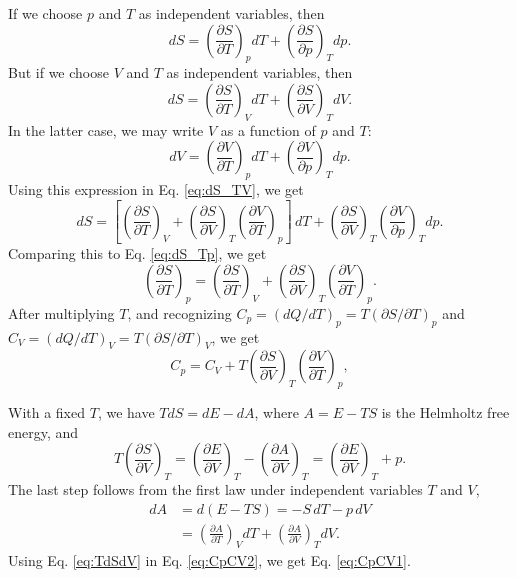 \documentclass[twocolumn, 10pt]{article}
\numberwithin{equation}{section}
\newenvironment{solution}[1][\empty]
{\par\medskip\sffamily
  \textbf{\ifx\empty#1{Solution.}\relax\else{#1}\fi} \ignorespaces}
{\medskip}
\begin{document}
\begin{solution}
If we choose $p$ and $T$ as independent variables, then
\begin{equation}
  dS =
  \left( \frac{ \partial S } { \partial T } \right)_p dT
  +
  \left( \frac{ \partial S } { \partial p } \right)_T dp.
  \label{eq:dS_Tp}
\end{equation}
But if we choose $V$ and $T$ as independent variables, then
\begin{equation}
  dS =
  \left( \frac{ \partial S } { \partial T } \right)_V dT
  +
  \left( \frac{ \partial S } { \partial V } \right)_T dV.
  \label{eq:dS_TV}
\end{equation}
In the latter case,
we may write $V$ as a function of $p$ and $T$:
$$
  dV =
  \left( \frac{ \partial V } { \partial T } \right)_p dT
  +
  \left( \frac{ \partial V } { \partial p } \right)_T dp.
$$
Using this expression in Eq. \eqref{eq:dS_TV}, we get
$$
  dS =
  \left[
  \left( \frac{ \partial S } { \partial T } \right)_V
  +
  \left( \frac{ \partial S } { \partial V } \right)_T
  \left( \frac{ \partial V } { \partial T } \right)_p
  \right] \, dT
  +
  \left( \frac{ \partial S } { \partial V } \right)_T
  \left( \frac{ \partial V } { \partial p } \right)_T dp.
$$
Comparing this to Eq. \eqref{eq:dS_Tp}, we get
%
\begin{equation}
  \left( \frac{ \partial S } { \partial T } \right)_p
  =
  \left( \frac{ \partial S } { \partial T } \right)_V
  +
  \left( \frac{ \partial S } { \partial V } \right)_T
  \left( \frac{ \partial V } { \partial T } \right)_p.
  \label{eq:dSdT_pV}
\end{equation}
%
After multiplying $T$,
  and recognizing
  $C_p = (dQ/dT)_p = T (\partial S/\partial T)_p$
  and
  $C_V = (dQ/dT)_V = T (\partial S/\partial T)_V$,
  we get
\begin{equation}
  C_p
  =
  C_V
  +
  T \left( \frac{ \partial S } { \partial V } \right)_T
  \left( \frac{ \partial V } { \partial T } \right)_p,
  \label{eq:CpCV2}
\end{equation}

With a fixed $T$, we have $T dS = dE - dA$,
where $A = E - TS$ is the Helmholtz free energy, and
\begin{equation}
  T \left( \frac{ \partial S } { \partial V } \right)_T
  =
  \left( \frac{ \partial E } { \partial V } \right)_T
  -
  \left( \frac{ \partial A } { \partial V } \right)_T
  =
  \left( \frac{ \partial E } { \partial V } \right)_T
  +p.
  \label{eq:TdSdV}
\end{equation}
The last step follows from
the first law under independent variables $T$ and $V$,
\begin{align*}
  dA
  &= d(E - TS) = -S \, dT - p \, dV
  \\
  &=
  \left( \frac{ \partial A } { \partial T } \right)_V dT
  +
  \left( \frac{ \partial A } { \partial V } \right)_T dV
  .
\end{align*}
Using Eq. \eqref{eq:TdSdV} in Eq. \eqref{eq:CpCV2},
we get Eq. \eqref{eq:CpCV1}.


\end{solution}
\end{document}
